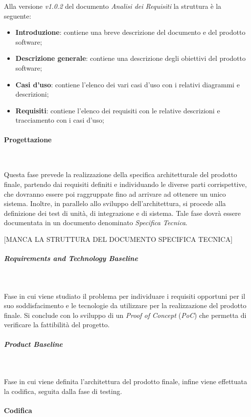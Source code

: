     Alla versione \textit{v1.0.2} del documento \textit{Analisi dei Requisiti} la struttura è la seguente:
    \begin{itemize}
        \item \textbf{Introduzione}: contiene una breve descrizione del documento e del prodotto software;
        \item \textbf{Descrizione generale}: contiene una descrizione degli obiettivi del prodotto software;
        \item \textbf{Casi d'uso}: contiene l'elenco dei vari casi d'uso con i relativi diagrammi e descrizioni;
        \item \textbf{Requisiti}: contiene l'elenco dei requisiti con le relative descrizioni e tracciamento con i casi d'uso;
    \end{itemize}

\paragraph{Progettazione}~

\noindent Questa fase prevede la realizzazione della specifica architetturale del prodotto finale, partendo dai requisiti definiti e individuando le diverse parti corrispettive, che dovranno essere poi raggruppate fino ad arrivare ad ottenere un unico sistema. \newline
Inoltre, in parallelo allo sviluppo dell'architettura, si procede alla definizione dei test di unità, di integrazione e di sistema. \newline
Tale fase dovrà essere documentata in un documento denominato \textit{Specifica Tecnica}.

[MANCA LA STRUTTURA DEL DOCUMENTO SPECIFICA TECNICA]

\subparagraph{Requirements and Technology Baseline}~

\noindent Fase in cui viene studiato il problema per individuare i requisiti opportuni per il suo soddisfacimento e le tecnologie da utilizzare per la realizzazione del prodotto finale. \newline
Si conclude con lo sviluppo di un \textit{Proof of Concept} (\textit{PoC}) che permetta di verificare la fattibilità del progetto.

\subparagraph{Product Baseline}~

\noindent Fase in cui viene definita l'architettura del prodotto finale, infine viene effettuata la codifica, seguita dalla fase di testing.


\paragraph{Codifica}~

